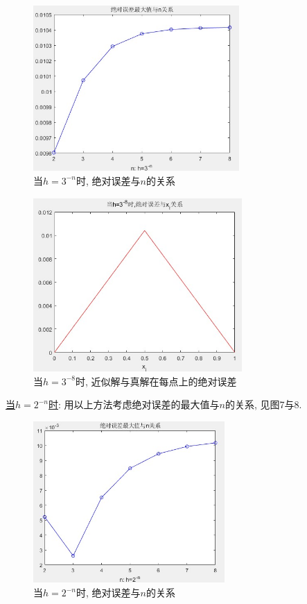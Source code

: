 \documentclass[12pt]{article}
\begin{document}
\begin{figure}[H]
	\centering
	\includegraphics[width=0.7\textwidth]{9}
	\caption{当$h=3^{-n}$时, 绝对误差与$n$的关系}
\end{figure}
\begin{figure}[H]
	\centering
	\includegraphics[width=0.71\textwidth]{10}
	\caption{当$h=3^{-8}$时, 近似解与真解在每点上的绝对误差}
\end{figure}
\noindent \underline{当$h=2^{-n}$时}: 用以上方法考虑绝对误差的最大值与$n$的关系, 见图7与8.
\begin{figure}[H]
	\centering
	\includegraphics[width=0.65\textwidth]{11}
	\caption{当$h=2^{-n}$时, 绝对误差与$n$的关系}
\end{figure}
\end{document}
